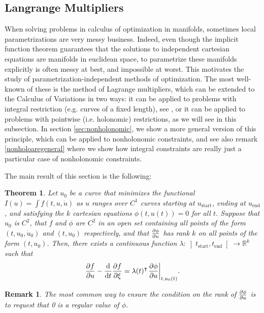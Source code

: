 \documentclass{article}
\theoremstyle{plain}
\newtheorem{theorem}{Theorem}
\theoremstyle{plain}
\newtheorem{remark}{Remark}
\theoremstyle{nonumberplain}
\theoremstyle{empty}
\newcommand{\R}{\mathbb{R}}
\newcommand{\tr}{\intercal}
\newcommand{\tstart}{\mathrm{start}}
\newcommand{\tend}{\mathrm{end}}
\DeclarePairedDelimiter\eval{.}{\rvert}
\begin{document}
\subsection{Langrange Multipliers}

When solving problems in calculus of optimization in manifolds, sometimes local parametrizations are very messy business. Indeed, even though the implicit function theorem guarantees that the solutions to independent cartesian equations are manifolds in euclidean space, to parametrize these manifolds explicitly is often messy at best, and impossible at worst. This motivates the study of parametrization-independent methods of optimization. The most well-known of these is the method of Lagrange multipliers, which can be extended to the Calculus of Variations in two ways: it can be applied to problems with integral restriction (e.g. curves of a fixed length), see \cite[\S 12.1]{gelfandfomin}, or it can be applied to problems with pointwise (i.e. holonomic) restrictions, as we will see in this subsection. In section \ref{sec:nonholonomic}, we show a more general version of this principle, which can be applied to nonholonomic constraints, and see also remark \ref{nonholoaregeneral} where we show how integral constraints are really just a particular case of nonholonomic constraints.

The main result of this section is the following:

\begin{theorem}\label{lagrangeholonomic}
Let $u_0$ be a curve that minimizes the functional $I(u) = \int f(t,u,\dot u)$ as $u$ ranges over $C^1$ curves starting at $u_\tstart$, ending at $u_\tend$, and satisfying the $k$ cartesian equations $\phi(t,u(t)) = 0$ for all $t$. Suppose that $u_0$ is $C^2$, that $f$ and $\phi$ are $C^2$ in an open set containing all points of the form $(t,u_0,\dot u_0)$ and $(t,u_0)$ respectively, and that $\diffp \phi u$ has rank $k$ on all points of the form $(t,u_0)$. Then, there exists a continuous function $\lambda \colon \left]t_\tstart, t_\tend\right[ \to \R^k$ such that
\begin{equation}\label{eq:lagrangeholonomic}
\diffp f u - \diff*{\diffp f \xi}t = \lambda(t)^\tr \eval*{\diffp{\phi}{u}}_{t,u_0(t)}.
\end{equation}
\end{theorem}

\begin{remark}
The most common way to ensure the condition on the rank of $\diffp \phi u$ is to request that 0 is a regular value of $\phi$.
\end{remark}
\end{document}
